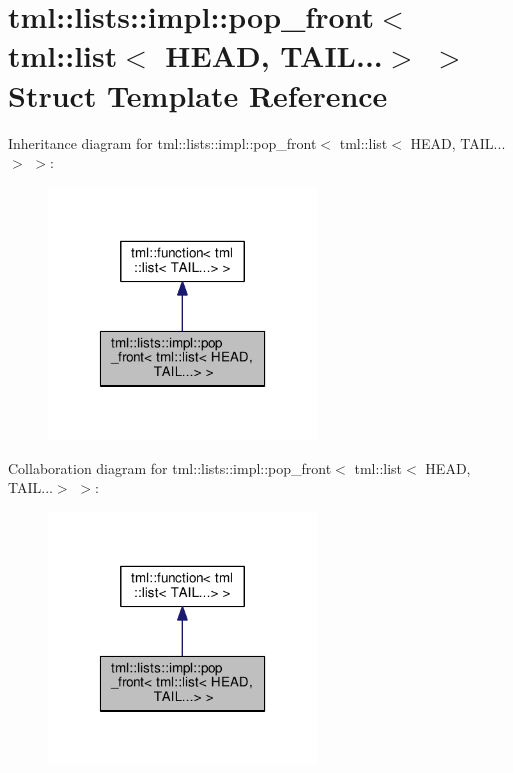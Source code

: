 \hypertarget{structtml_1_1lists_1_1impl_1_1pop__front_3_01tml_1_1list_3_01_h_e_a_d_00_01_t_a_i_l_8_8_8_4_01_4}{\section{tml\+:\+:lists\+:\+:impl\+:\+:pop\+\_\+front$<$ tml\+:\+:list$<$ H\+E\+A\+D, T\+A\+I\+L...$>$ $>$ Struct Template Reference}
\label{structtml_1_1lists_1_1impl_1_1pop__front_3_01tml_1_1list_3_01_h_e_a_d_00_01_t_a_i_l_8_8_8_4_01_4}
}


Inheritance diagram for tml\+:\+:lists\+:\+:impl\+:\+:pop\+\_\+front$<$ tml\+:\+:list$<$ H\+E\+A\+D, T\+A\+I\+L...$>$ $>$\+:
\nopagebreak
\begin{figure}[H]
\begin{center}
\leavevmode
\includegraphics[width=202pt]{structtml_1_1lists_1_1impl_1_1pop__front_3_01tml_1_1list_3_01_h_e_a_d_00_01_t_a_i_l_8_8_8_4_01_4__inherit__graph}
\end{center}
\end{figure}


Collaboration diagram for tml\+:\+:lists\+:\+:impl\+:\+:pop\+\_\+front$<$ tml\+:\+:list$<$ H\+E\+A\+D, T\+A\+I\+L...$>$ $>$\+:
\nopagebreak
\begin{figure}[H]
\begin{center}
\leavevmode
\includegraphics[width=202pt]{structtml_1_1lists_1_1impl_1_1pop__front_3_01tml_1_1list_3_01_h_e_a_d_00_01_t_a_i_l_8_8_8_4_01_4__coll__graph}
\end{center}
\end{figure}
